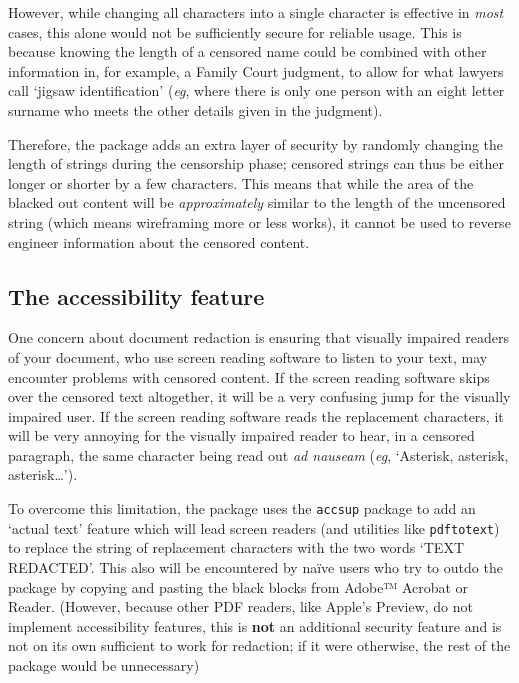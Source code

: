 \documentclass{article}
\begin{document}
  However, while changing all characters into a single character is effective in \textit{most} cases, this alone would not be sufficiently secure for reliable usage.  This is because knowing the length of a censored name could be combined with other information in, for example, a Family Court judgment, to allow for what lawyers call `jigsaw identification' (\textit{eg}, where there is only one person with an eight letter surname who meets the other details given in the judgment).  

Therefore, the package adds an extra layer of security by randomly changing the length of strings during the censorship phase; censored strings can thus be either longer or shorter by a few characters.  This means that while the area of the blacked out content will be \textit{approximately} similar to the length of the uncensored string (which means wireframing more or less works), it cannot be used to reverse engineer information about the censored content.  

\subsection{The accessibility feature}
One concern about document redaction is ensuring that visually impaired readers of your document, who use screen reading software to listen to your text, may encounter problems with censored content.  If the screen reading software skips over the censored text altogether, it will be a very confusing jump for the visually impaired user.  If the screen reading software reads the replacement characters, it will be very annoying for the visually impaired reader to hear, in a censored paragraph, the same character being read out \textit{ad nauseam} (\textit{eg}, `Asterisk, asterisk, asterisk…').

To overcome this limitation, the package uses the \texttt{accsup} package to add an `actual text' feature which will lead screen readers (and utilities like \texttt{pdftotext}) to replace the string of replacement characters with the two words `TEXT REDACTED'. This also will be encountered by naïve users who try to outdo the package by copying and pasting the black blocks from Adobe™ Acrobat or Reader.  (However, because other PDF readers, like Apple's Preview, do not implement accessibility features, this is \textbf{not} an additional security feature and is not on its own sufficient to work for redaction; if it were otherwise, the rest of the package would be unnecessary)
\end{document}
